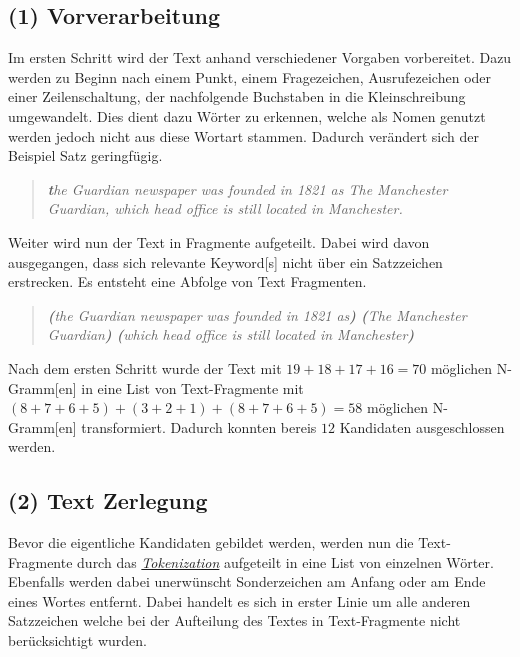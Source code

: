 
\subsection{(1) Vorverarbeitung}


Im ersten Schritt wird der Text anhand verschiedener Vorgaben vorbereitet. Dazu werden zu Beginn nach einem Punkt, einem Fragezeichen, Ausrufezeichen oder einer Zeilenschaltung, der nachfolgende Buchstaben in die Kleinschreibung umgewandelt. Dies dient dazu Wörter zu erkennen, welche als Nomen genutzt werden jedoch nicht aus diese Wortart stammen. Dadurch verändert sich der Beispiel Satz geringfügig. 

\begin{quote}
\textit{\textbf{t}he Guardian newspaper was founded in 1821 as \glqq The Manchester Guardian\grqq, which head office is still located in Manchester.}
\end{quote}

Weiter wird nun der Text in Fragmente aufgeteilt. Dabei wird davon ausgegangen, dass sich relevante \gls{Keyword}[s] nicht über ein Satzzeichen erstrecken. Es entsteht eine Abfolge von Text Fragmenten.
\begin{quote}
\textit{\textbf{(}the Guardian newspaper was founded in 1821 as\textbf{)} \textbf{(}The Manchester Guardian\textbf{)} \textbf{(}which head office is still located in Manchester\textbf{)}}
\end{quote}
Nach dem ersten Schritt wurde der Text mit $19+18+17+16=70$ möglichen \gls{N-Gramm}[en] in eine List von Text-Fragmente mit $(8+7+6+5)+(3+2+1)+(8+7+6+5)=58$ möglichen \gls{N-Gramm}[en] transformiert. Dadurch konnten bereis $12$ Kandidaten ausgeschlossen werden.


\subsection{(2) Text Zerlegung}


Bevor die eigentliche Kandidaten gebildet werden, werden nun die Text-Fragmente durch das \hyperref[tokenization]{\textit{Tokenization}} aufgeteilt in eine List von einzelnen Wörter. Ebenfalls werden dabei unerwünscht Sonderzeichen am Anfang oder am Ende eines Wortes entfernt. Dabei handelt es sich in erster Linie um alle anderen Satzzeichen welche bei der Aufteilung des Textes in Text-Fragmente nicht berücksichtigt wurden.

